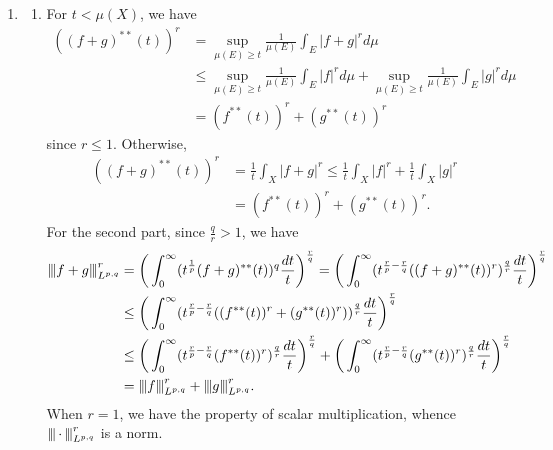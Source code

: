 \begin{enumerate}
\item[1.4.3.]
   \begin{enumerate}
   \item[(a)] For $t < \mu(X)$, we have
   \begin{equation*}\begin{aligned}
   ((f+g)^{**}(t))^{r} &= \sup_{\mu(E) \geq t} \frac{1}{\mu(E)}\int_{E}|f+g|^{r}d\mu \\
   &\leq \sup_{\mu(E) \geq t} \frac{1}{\mu(E)}\int_{E}|f|^{r}d\mu 
   + \sup_{\mu(E) \geq t} \frac{1}{\mu(E)}\int_{E}|g|^{r}d\mu \\
   &= (f^{**}(t))^{r} + (g^{**}(t))^{r}
   \end{aligned}\end{equation*}
   since $r \leq 1$. Otherwise,
   \begin{equation*}\begin{aligned}
   ((f+g)^{**}(t))^{r} &= \frac{1}{t}\int_{X}|f+g|^{r} \leq \frac{1}{t}\int_{X}|f|^{r} + \frac{1}{t}\int_{X}|g|^{r} 
   \\&= (f^{**}(t))^{r} + (g^{**}(t))^{r}.
   \end{aligned}\end{equation*}
   For the second part, since $\frac{q}{r}>1$, we have
   \begin{equation*}\begin{aligned}
   {\left\vert\kern-0.25ex\left\vert\kern-0.25ex\left\vert f+g \right\vert\kern-0.25ex\right\vert\kern-0.25ex\right\vert}_{L^{p,q}}^{r} &= \bigg(\int_{0}^{\infty}(t^{\frac{1}{p}}(f+g)^{**}(t))^{q}\frac{dt}{t}\bigg)^{\frac{r}{q}} 
   = \bigg(\int_{0}^{\infty}(t^{\frac{r}{p}-\frac{r}{q}}((f+g)^{**}(t))^{r})^{\frac{q}{r}}\frac{dt}{t}\bigg)^{\frac{r}{q}}
   \\&\leq \bigg(\int_{0}^{\infty}(t^{\frac{r}{p}-\frac{r}{q}}((f^{**}(t))^{r}+(g^{**}(t))^{r}))^{\frac{q}{r}}\frac{dt}{t}\bigg)^{\frac{r}{q}}
   \\&\leq \bigg(\int_{0}^{\infty}(t^{\frac{r}{p}-\frac{r}{q}}(f^{**}(t))^{r})^{\frac{q}{r}}\frac{dt}{t}\bigg)^{\frac{r}{q}} 
   + \bigg(\int_{0}^{\infty}(t^{\frac{r}{p}-\frac{r}{q}}(g^{**}(t))^{r})^{\frac{q}{r}}\frac{dt}{t}\bigg)^{\frac{r}{q}}
   \\&= {\left\vert\kern-0.25ex\left\vert\kern-0.25ex\left\vert f \right\vert\kern-0.25ex\right\vert\kern-0.25ex\right\vert}_{L^{p,q}}^{r} + {\left\vert\kern-0.25ex\left\vert\kern-0.25ex\left\vert g \right\vert\kern-0.25ex\right\vert\kern-0.25ex\right\vert}_{L^{p,q}}^{r}.
   \end{aligned}\end{equation*}
   When $r=1$, we have the property of scalar multiplication, whence ${\left\vert\kern-0.25ex\left\vert\kern-0.25ex\left\vert \,\cdot\, \right\vert\kern-0.25ex\right\vert\kern-0.25ex\right\vert}_{L^{p,q}}^{r}$ is a norm.


\end{enumerate}
\end{enumerate}
